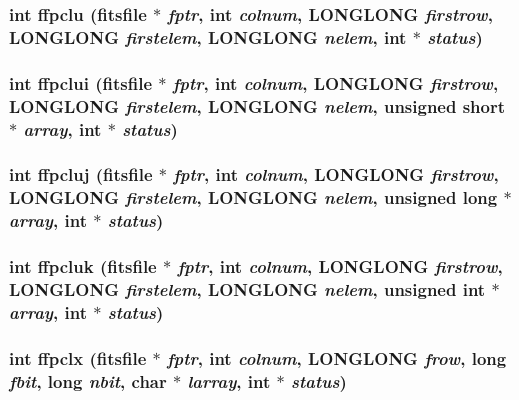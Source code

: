 \subsubsection{\setlength{\rightskip}{0pt plus 5cm}int ffpclu (\bf{fitsfile} $\ast$ {\em fptr}, int {\em colnum}, \bf{LONGLONG} {\em firstrow}, \bf{LONGLONG} {\em firstelem}, \bf{LONGLONG} {\em nelem}, int $\ast$ {\em status})}\label{src_2fitsio_8h_d0b72bec18b86400b6610d40ef80e0a4}


\subsubsection{\setlength{\rightskip}{0pt plus 5cm}int ffpclui (\bf{fitsfile} $\ast$ {\em fptr}, int {\em colnum}, \bf{LONGLONG} {\em firstrow}, \bf{LONGLONG} {\em firstelem}, \bf{LONGLONG} {\em nelem}, unsigned short $\ast$ {\em array}, int $\ast$ {\em status})}\label{src_2fitsio_8h_dbc957468fec6139e57ddb838f5782a7}


\subsubsection{\setlength{\rightskip}{0pt plus 5cm}int ffpcluj (\bf{fitsfile} $\ast$ {\em fptr}, int {\em colnum}, \bf{LONGLONG} {\em firstrow}, \bf{LONGLONG} {\em firstelem}, \bf{LONGLONG} {\em nelem}, unsigned long $\ast$ {\em array}, int $\ast$ {\em status})}\label{src_2fitsio_8h_93be7636ae678f27fed9c25ca171c009}


\subsubsection{\setlength{\rightskip}{0pt plus 5cm}int ffpcluk (\bf{fitsfile} $\ast$ {\em fptr}, int {\em colnum}, \bf{LONGLONG} {\em firstrow}, \bf{LONGLONG} {\em firstelem}, \bf{LONGLONG} {\em nelem}, unsigned int $\ast$ {\em array}, int $\ast$ {\em status})}\label{src_2fitsio_8h_b4d5611f33c75c133789ec5742f76240}


\subsubsection{\setlength{\rightskip}{0pt plus 5cm}int ffpclx (\bf{fitsfile} $\ast$ {\em fptr}, int {\em colnum}, \bf{LONGLONG} {\em frow}, long {\em fbit}, long {\em nbit}, char $\ast$ {\em larray}, int $\ast$ {\em status})}\label{src_2fitsio_8h_36824bfe44a4dbdee167ea243384cab2}


